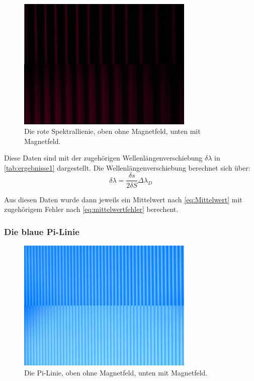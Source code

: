 \begin{figure}
  \centering
  \includegraphics[width=0.75\textwidth]{content/grafiken/rot 0.JPG}
  \caption{Die rote Spektrallienie, oben ohne Magnetfeld, unten mit Magnetfeld.}
  \label{fig:rot0}
\end{figure}

Diese Daten sind mit der zugehörigen Wellenlängenverschiebung
$\delta \lambda$ in \autoref{tab:ergebnisse1} dargestellt. Die Wellenlängenverschiebung berechnet sich über:
\begin{equation}
  \delta \lambda =\frac{\delta s}{2\delta S}\Delta \lambda_D
\end{equation}

Aus diesen Daten wurde dann jeweils ein Mittelwert nach \autoref{eq:Mittelwert} mit zugehörigem Fehler nach
\autoref{eq:mittelwertfehler} berechent.

\FloatBarrier
\newpage
\subsubsection{Die blaue Pi-Linie}
\begin{figure}
  \centering
  \includegraphics[width=0.75\textwidth]{content/grafiken/blau 90.JPG}
  \caption{Die Pi-Linie, oben ohne Magnetfeld, unten mit Magnetfeld.}
  \label{fig:blau90}
\end{figure}




